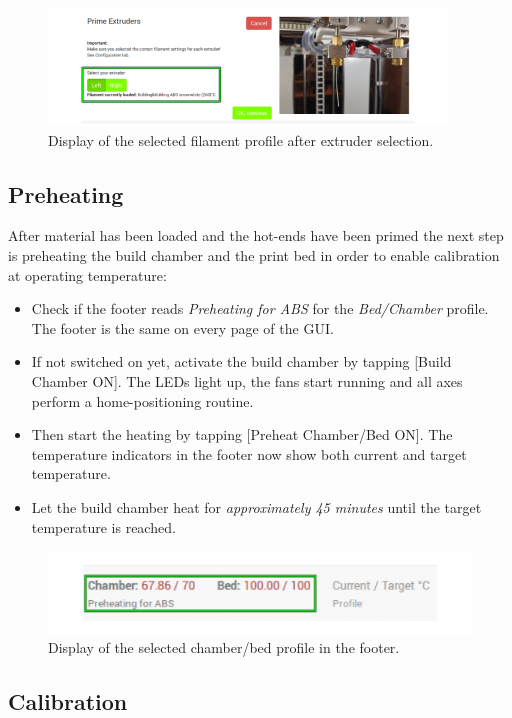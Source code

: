 \begin{figure}[H]
  \centering
  \includegraphics[width=.7\linewidth]{./img/gui_primext_1_v110.png}
  \caption{Display of the selected filament profile after extruder selection.}
\end{figure}


\subsection{Preheating}

After material has been loaded and the hot-ends have been primed the next step is preheating the build chamber and the print bed in order to enable calibration at operating temperature: 


\begin{itemize}
  \item Check if the footer reads \emph{Preheating for ABS} for the \emph{Bed/Chamber} 
        profile. The footer is the same on every page of the GUI.
  \item If not switched on yet, activate the build chamber by tapping [Build Chamber ON]. The LEDs light up, the 
        fans start running and all axes perform a home-positioning routine.
  \item Then start the heating by tapping [Preheat Chamber/Bed ON]. The temperature 
        indicators in the footer now show both current and target temperature.
  \item Let the build chamber heat for \emph{approximately 45 minutes} until the target 
        temperature is reached.
\end{itemize}


\begin{figure}[H]
  \centering
  \includegraphics[width=.7\linewidth]{./img/gui_footercut_v110.png}
  \caption{Display of the selected chamber/bed profile in the footer.}
\end{figure}


\subsection{Calibration}

